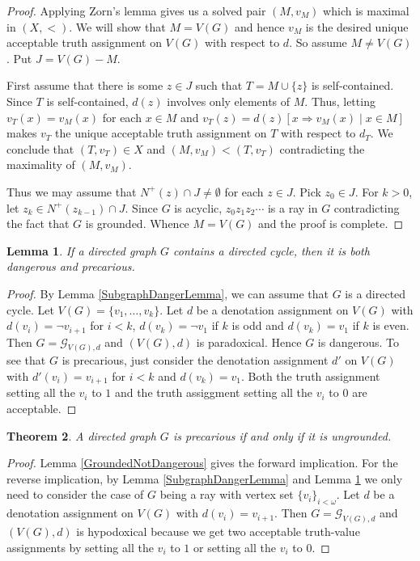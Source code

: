 \documentclass[12pt]{kluwer}
\newtheorem{thm}{Theorem}
\newtheorem{lem}[thm]{Lemma}
\theoremstyle{remark}
\newcommand{\fancy}[1]{\mathcal{#1}}
\def\G{\fancy{G}}
\begin{document}
\begin{proof}
Applying Zorn's lemma gives us a solved pair $(M, v_M)$ which is maximal in $(X, <)$.  We will show that $M = V(G)$ and hence $v_M$ is the desired unique acceptable truth assignment on $V(G)$ with respect to $d$.  So assume $M \neq V(G)$.  Put $J = V(G) - M$.

First assume that there is some $z \in J$ such that $T = M \cup \{z\}$ is self-contained.  Since $T$ is self-contained, $d(z)$ involves only elements of $M$.  Thus, letting $v_T(x) = v_M(x)$ for each $x \in M$ and $v_T(z) = d(z)[x \Rightarrow v_M(x) \mid x \in M]$ makes $v_T$ the unique acceptable truth assignment on $T$ with respect to $d_T$.  We conclude that $(T, v_T) \in X$ and $(M, v_M) < (T, v_T)$ contradicting the maximality of $(M, v_M)$.

Thus we may assume that $N^+(z) \cap J \neq \emptyset$ for each $z \in J$.  Pick $z_0 \in J$.  For $k > 0$, let $z_k \in N^+(z_{k - 1}) \cap J$.  Since $G$ is acyclic, $z_0z_1z_2\cdots$ is a ray in $G$ contradicting the fact that $G$ is grounded.  Whence $M = V(G)$ and the proof is complete.
\end{proof}

\begin{lem}\label{DirectedCyclesMakeDanger}
If a directed graph $G$ contains a directed cycle, then it is both dangerous and precarious.
\end{lem}
\begin{proof}
By Lemma \ref{SubgraphDangerLemma}, we can assume that $G$ is a directed cycle.  Let $V(G) = \{v_1, \ldots, v_k\}$.  Let $d$ be a denotation assignment on $V(G)$ with $d(v_i) = \neg v_{i + 1}$ for $i < k$, $d(v_k) = \neg v_1$ if $k$ is odd and $d(v_k) = v_1$ if $k$ is even.  Then $G = \G_{V(G), d}$ and $(V(G), d)$ is paradoxical.  Hence $G$ is dangerous.  To see that $G$ is precarious, just consider the denotation assignment $d'$ on $V(G)$ with $d'(v_i) = v_{i + 1}$ for $i < k$ and $d(v_k) = v_1$.  Both the truth assignment setting all the $v_i$ to $1$ and the truth assiggment setting all the $v_i$ to $0$ are acceptable.
\end{proof}

\begin{thm}\label{PrecariousCharacterization}
A directed graph $G$ is precarious if and only if it is ungrounded.
\end{thm}
\begin{proof}
Lemma \ref{GroundedNotDangerous} gives the forward implication.  For the reverse implication, by Lemma \ref{SubgraphDangerLemma} and Lemma \ref{DirectedCyclesMakeDanger} we only need to consider the case of $G$ being a ray with vertex set $\{v_i\}_{i < \omega}$.  Let $d$ be a denotation assignment on $V(G)$ with $d(v_i) = v_{i+1}$.  Then $G = \G_{V(G), d}$ and $(V(G), d)$ is hypodoxical because we get two acceptable truth-value assignments by setting all the $v_i$ to $1$ or setting all the $v_i$ to $0$.
\end{proof}
\end{document}
